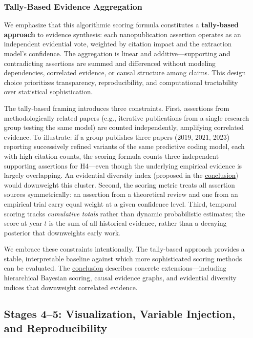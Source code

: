 \documentclass[
  english,
]{article}
\begin{document}
\subsubsection{Tally-Based Evidence
Aggregation}\label{tally-based-evidence-aggregation}

We emphasize that this algorithmic scoring formula constitutes a
\textbf{tally-based approach} to evidence synthesis: each
nanopublication assertion operates as an independent evidential vote,
weighted by citation impact and the extraction model's confidence. The
aggregation is linear and additive---supporting and contradicting
assertions are summed and differenced without modeling dependencies,
correlated evidence, or causal structure among claims. This design
choice prioritizes transparency, reproducibility, and computational
tractability over statistical sophistication.

The tally-based framing introduces three constraints. First, assertions
from methodologically related papers (e.g., iterative publications from
a single research group testing the same model) are counted
independently, amplifying correlated evidence. To illustrate: if a group
publishes three papers (2019, 2021, 2023) reporting successively refined
variants of the same predictive coding model, each with high citation
counts, the scoring formula counts three independent supporting
assertions for H4---even though the underlying empirical evidence is
largely overlapping. An evidential diversity index (proposed in the
\hyperref[sec:conclusion]{conclusion}) would downweight this cluster.
Second, the scoring metric treats all assertion sources symmetrically:
an assertion from a theoretical review and one from an empirical trial
carry equal weight at a given confidence level. Third, temporal scoring
tracks \emph{cumulative totals} rather than dynamic probabilistic
estimates; the score at year \(t\) is the sum of all historical
evidence, rather than a decaying posterior that downweights early work.

We embrace these constraints intentionally. The tally-based approach
provides a stable, interpretable baseline against which more
sophisticated scoring methods can be evaluated. The
\hyperref[sec:conclusion]{conclusion} describes concrete
extensions---including hierarchical Bayesian scoring, causal evidence
graphs, and evidential diversity indices that downweight correlated
evidence.

\newpage

\subsection{\texorpdfstring{Stages 4--5: Visualization, Variable
Injection, and Reproducibility
\label{sec:methods_viz}}{Stages 4--5: Visualization, Variable Injection, and Reproducibility}}\label{stages-45-visualization-variable-injection-and-reproducibility}
\end{document}
